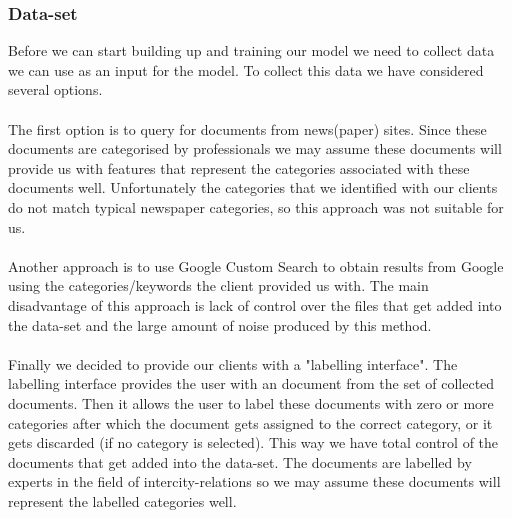 \subsubsection{Data-set}
Before we can start building up and training our model we need to collect data we can use as an input for the model. To collect this data we have considered several options.
\\
\\
The first option is to query for documents from news(paper) sites. Since these documents are categorised by professionals we may assume these documents will provide us with features that represent the categories associated with these documents well.
Unfortunately the categories that we identified with our clients do not match typical newspaper categories, so this approach was not suitable for us.
\\
\\
Another approach is to use Google Custom Search to obtain results from Google using the categories/keywords the client provided us with. The main disadvantage of this approach is lack of control over the files that get added into the data-set and the large amount of noise produced by this method.
\\
\\
Finally we decided to provide our clients with a "labelling interface". The labelling interface provides the user with an document from the set of collected documents. Then it allows the user to label these documents with zero or more categories after which the document gets assigned to the correct category, or it gets discarded (if no category is selected). This way we have total control of the documents that get added into the data-set. The documents are labelled by experts in the field of intercity-relations so we may assume these documents will represent the labelled categories well. 

